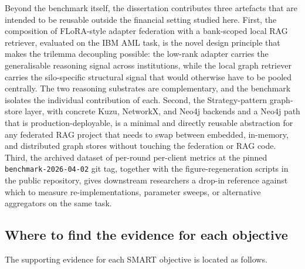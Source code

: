 \documentclass{report}
\begin{document}
Beyond the benchmark itself, the dissertation contributes three artefacts that are intended to be reusable outside the financial setting studied here. First, the composition of FLoRA-style adapter federation with a bank-scoped local RAG retriever, evaluated on the IBM AML task, is the novel design principle that makes the trilemma decoupling possible: the low-rank adapter carries the generalisable reasoning signal across institutions, while the local graph retriever carries the silo-specific structural signal that would otherwise have to be pooled centrally. The two reasoning substrates are complementary, and the benchmark isolates the individual contribution of each. Second, the Strategy-pattern graph-store layer, with concrete Kuzu, NetworkX, and Neo4j backends and a Neo4j path that is production-deployable, is a minimal and directly reusable abstraction for any federated RAG project that needs to swap between embedded, in-memory, and distributed graph stores without touching the federation or RAG code. Third, the archived dataset of per-round per-client metrics at the pinned \texttt{benchmark-2026-04-02} git tag, together with the figure-regeneration scripts in the public repository, gives downstream researchers a drop-in reference against which to measure re-implementations, parameter sweeps, or alternative aggregators on the same task.

\subsection*{Where to find the evidence for each objective}

The supporting evidence for each SMART objective is located as follows.
\end{document}

